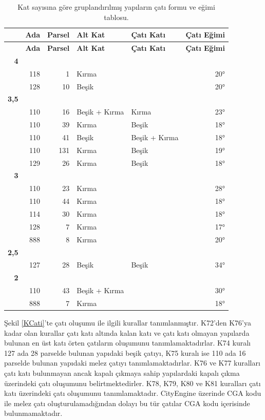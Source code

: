 \documentclass[12pt,turkish,a4paperpaper,]{report}
\begin{document}
\begin{longtable}[]{@{}rrrllr@{}}
\caption{Kat sayısına göre gruplandırılmış yapıların çatı formu ve eğimi
tablosu. \label{Cati}}\tabularnewline
\toprule
& \textbf{Ada} & \textbf{Parsel} & \textbf{Alt Kat} & \textbf{Çatı Katı}
& \textbf{Çatı Eğimi}\tabularnewline
\midrule
\endfirsthead
\toprule
& \textbf{Ada} & \textbf{Parsel} & \textbf{Alt Kat} & \textbf{Çatı Katı}
& \textbf{Çatı Eğimi}\tabularnewline
\midrule
\endhead
\textbf{4} & & & & &\tabularnewline
& 118 & 1 & Kırma & & 20°\tabularnewline
& 128 & 10 & Beşik & & 20°\tabularnewline
\textbf{3,5} & & & & &\tabularnewline
& 110 & 16 & Beşik + Kırma & Kırma & 23°\tabularnewline
& 110 & 39 & Kırma & Beşik & 18°\tabularnewline
& 110 & 41 & Beşik & Beşik + Kırma & 18°\tabularnewline
& 110 & 131 & Kırma & Beşik & 19°\tabularnewline
& 129 & 26 & Kırma & Beşik & 18°\tabularnewline
\textbf{3} & & & & &\tabularnewline
& 110 & 23 & Kırma & & 28°\tabularnewline
& 110 & 44 & Kırma & & 18°\tabularnewline
& 114 & 30 & Kırma & & 18°\tabularnewline
& 128 & 7 & Kırma & & 17°\tabularnewline
& 888 & 8 & Kırma & & 20°\tabularnewline
\textbf{2,5} & & & & &\tabularnewline
& 127 & 28 & Beşik & Beşik & 34°\tabularnewline
\textbf{2} & & & & &\tabularnewline
& 110 & 43 & Beşik + Kırma & & 30°\tabularnewline
& 888 & 7 & Kırma & & 18°\tabularnewline
\bottomrule
\end{longtable}

Şekil \ref{KCati}'te çatı oluşumu ile ilgili kurallar tanımlanmıştır.
K72'den K76'ya kadar olan kurallar çatı katı altında kalan katı ve çatı
katı olmayan yapılarda bulunan en üst katı örten çatıların oluşumunu
tanımlamaktadırlar. K74 kuralı 127 ada 28 parselde bulunan yapıdaki
beşik çatıyı, K75 kuralı ise 110 ada 16 parselde bulunan yapıdaki melez
çatıyı tanımlamaktadırlar. K76 ve K77 kuralları çatı katı bulunmayan
ancak kapalı çıkmaya sahip yapılardaki kapalı çıkma üzerindeki çatı
oluşumunu belirtmektedirler. K78, K79, K80 ve K81 kuralları çatı katı
üzerindeki çatı oluşumunu tanımlamaktadır. CityEngine üzerinde CGA kodu
ile melez çatı oluşturulamadığından dolayı bu tür çatılar CGA kodu
içerisinde bulunmamaktadır.
\end{document}
